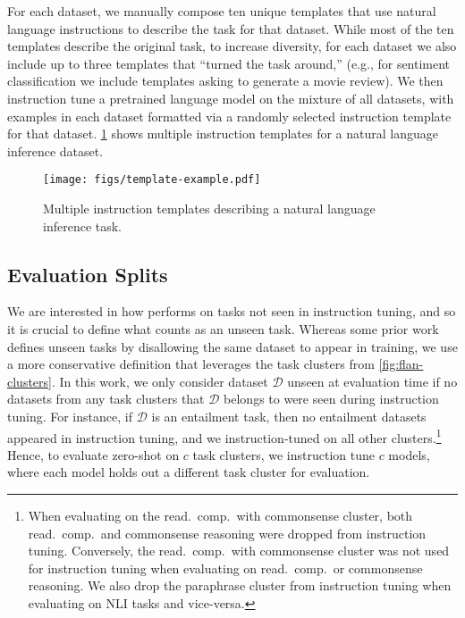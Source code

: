 For each dataset, we manually compose ten unique templates that use natural language instructions to describe the task for that dataset.
While most of the ten templates describe the original task, to increase diversity, for each dataset we also include up to three templates that ``turned the task around,'' (e.g., for sentiment classification we include templates asking to generate a movie review).
We then instruction tune a pretrained language model on the mixture of all datasets, with examples in each dataset formatted via a randomly selected instruction template for that dataset.
\cref{fig:flan-template-example} shows multiple instruction templates for a natural language inference dataset.
\vspace{-1mm}
\begin{figure}[h]
    \centering
    \texttt{[image: figs/template-example.pdf]}
    \vspace{-3mm}
    \caption{Multiple instruction templates describing a natural language inference task.}
    \vspace{-1mm}
    \label{fig:flan-template-example}
\end{figure}

\subsection{Evaluation Splits}\label{subsec:eval_splits}
We are interested in how \flan{} performs on tasks not seen in instruction tuning, and so it is crucial to define what counts as an unseen task.
Whereas some prior work defines unseen tasks by disallowing the same dataset to appear in training, we use a more conservative definition that leverages the task clusters from \cref{fig:flan-clusters}.
In this work, we only consider dataset $\mathcal{D}$ unseen at evaluation time if no datasets from any task clusters that $\mathcal{D}$ belongs to were seen during instruction tuning.
For instance, if $\mathcal{D}$ is an entailment task, then no entailment datasets appeared in instruction tuning, and we instruction-tuned on all other clusters.\footnote{When evaluating on the read.\ comp.\ with commonsense cluster, both read.\ comp.\ and commonsense reasoning were dropped from instruction tuning.
Conversely, the read.\ comp.\ with commonsense cluster was not used for instruction tuning when evaluating on read.\ comp.\ or commonsense reasoning.
We also drop the paraphrase cluster from instruction tuning when evaluating on NLI tasks and vice-versa.}
Hence, to evaluate zero-shot \flan{} on $c$ task clusters, we instruction tune $c$ models, where each model holds out a different task cluster for evaluation.

